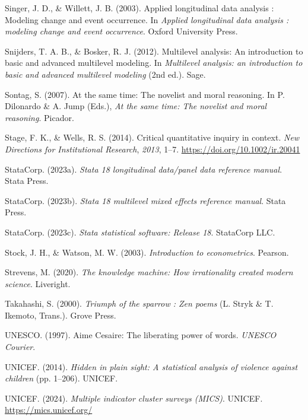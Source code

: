 \documentclass[
  letterpaper,
  DIV=11,
  numbers=noendperiod]{scrreprt}
\newlength{\cslhangindent}
\newenvironment{CSLReferences}[2] %
 {\begin{list}{}{%
  \setlength{\itemindent}{0pt}
  \setlength{\leftmargin}{0pt}
  \setlength{\parsep}{0pt}
  \ifodd #1
   \setlength{\leftmargin}{\cslhangindent}
   \setlength{\itemindent}{-1\cslhangindent}
  \fi
  \setlength{\itemsep}{#2\baselineskip}}}
 {\end{list}}
\begin{document}
\begin{CSLReferences}{1}{0}
Singer, J. D., \& Willett, J. B. (2003). Applied longitudinal data
analysis : Modeling change and event occurrence. In \emph{Applied
longitudinal data analysis : modeling change and event occurrence}.
Oxford University Press.

Snijders, T. A. B., \& Bosker, R. J. (2012). Multilevel analysis: An
introduction to basic and advanced multilevel modeling. In
\emph{Multilevel analysis: an introduction to basic and advanced
multilevel modeling} (2nd ed.). Sage.

Sontag, S. (2007). At the same time: The novelist and moral reasoning.
In P. Dilonardo \& A. Jump (Eds.), \emph{At the same time: The novelist
and moral reasoning}. Picador.

Stage, F. K., \& Wells, R. S. (2014). Critical quantitative inquiry in
context. \emph{New Directions for Institutional Research}, \emph{2013},
1--7. \url{https://doi.org/10.1002/ir.20041}

StataCorp. (2023a). \emph{Stata 18 longitudinal data/panel data
reference manual}. Stata Press.

StataCorp. (2023b). \emph{Stata 18 multilevel mixed effects reference
manual}. Stata Press.

StataCorp. (2023c). \emph{Stata statistical software: Release 18}.
StataCorp LLC.

Stock, J. H., \& Watson, M. W. (2003). \emph{Introduction to
econometrics}. Pearson.

Strevens, M. (2020). \emph{The knowledge machine: How irrationality
created modern science}. Liveright.

Takahashi, S. (2000). \emph{Triumph of the sparrow : Zen poems} (L.
Stryk \& T. Ikemoto, Trans.). Grove Press.

UNESCO. (1997). {A}ime {C}esaire: The liberating power of words.
\emph{UNESCO Courier}.

UNICEF. (2014). \emph{Hidden in plain sight: A statistical analysis of
violence against children} (pp. 1--206). UNICEF.

UNICEF. (2024). \emph{Multiple indicator cluster surveys (MICS)}.
UNICEF. \url{https://mics.unicef.org/}


\end{CSLReferences}
\end{document}
